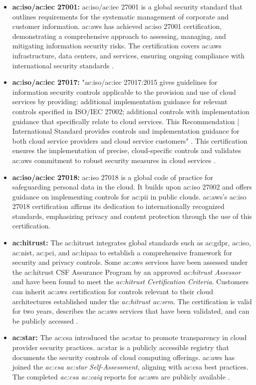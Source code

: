 \begin{itemize}
    \item \textbf{\gls{ac:iso}/\gls{ac:iec} 27001:} \gls{ac:iso}/\gls{ac:iec} 27001 is a global security standard that outlines requirements for the systematic management of corporate and customer information. \gls{ac:aws} has achieved \gls{ac:iso} 27001 certification, demonstrating a comprehensive approach to assessing, managing, and mitigating information security risks. The certification covers \gls{ac:aws} infrastructure, data centers, and services, ensuring ongoing compliance with international security standards \cite{ISOIEC27001}.
    \item \textbf{\gls{ac:iso}/\gls{ac:iec} 27017:} "\gls{ac:iso}/\gls{ac:iec} 27017:2015 gives guidelines for information security controls applicable to the provision and use of cloud services by providing: additional implementation guidance for relevant controls specified in ISO/IEC 27002; additional controls with implementation guidance that specifically relate to cloud services. This Recommendation | International Standard provides controls and implementation guidance for both cloud service providers and cloud service customers" \cite{ISOIEC27017}. This certification ensures the implementation of precise, cloud-specific controls and validates \gls{ac:aws} commitment to robust security measures in cloud services \cite{AWSISOIEC27017}.
    \item \textbf{\gls{ac:iso}/\gls{ac:iec} 27018:} \gls{ac:iso} 27018 is a global code of practice for safeguarding personal data in the cloud. It builds upon \gls{ac:iso} 27002 and offers guidance on implementing controls for \gls{ac:pii} in public clouds. \gls{ac:aws}'s \gls{ac:iso} 27018 certification affirms its dedication to internationally recognized standards, emphasizing privacy and content protection through the use of this certification\cite{AWSISOIEC27018}.
    \item \textbf{\gls{ac:hitrust}:} The \gls{ac:hitrust} integrates global standards such as \gls{ac:gdpr}, \gls{ac:iso}, \gls{ac:nist}, \gls{ac:pci}, and \gls{ac:hipaa} to establish a comprehensive framework for security and privacy controls. Some \gls{ac:aws} services have been assessed under the \gls{ac:hitrust} CSF Assurance Program by an approved \textit{\gls{ac:hitrust} Assessor} and have been found to meet the \textit{\gls{ac:hitrust} Certification Criteria}. Customers can inherit \gls{ac:aws} certification for controls relevant to their cloud architectures established under the \textit{\gls{ac:hitrust} \gls{ac:srm}}. The certification is valid for two years, describes the \gls{ac:aws} services that have been validated, and can be publicly accessed \cite{AWSHITRUSTCSF}.
    \item \textbf{\gls{ac:star}:} The \gls{ac:csa} introduced the \gls{ac:star} to promote transparency in cloud provider security practices. \gls{ac:star} is a publicly accessible registry that documents the security controls of cloud computing offerings. \gls{ac:aws} has joined the \textit{\gls{ac:csa} \gls{ac:star} Self-Assessment}, aligning with \gls{ac:csa} best practices. The completed \textit{\gls{ac:csa} \gls{ac:caiq}} reports for \gls{ac:aws} are publicly available \cite{AWSCSA}.
\end{itemize}

